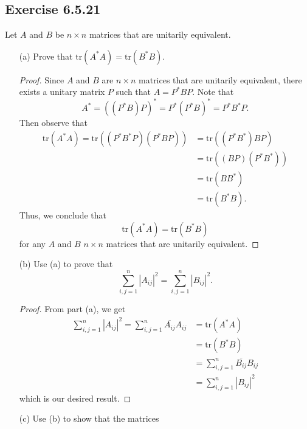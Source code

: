 \subsection*{Exercise 6.5.21} Let \( A  \) and \( B  \) be \( n \times n  \) matrices that are unitarily equivalent.
\begin{enumerate}
    \item[(a)] Prove that \( \text{tr}(A^{*}A) = \text{tr}(B^{*}B) \).
        \begin{proof}
        Since \( A  \) and \( B  \) are \( n \times n  \) matrices that are unitarily equivalent, there exists a unitary matrix \( P  \) such that \( A = P^{*} B P  \). Note that
        \[  A^{*} = ((P^{*}B)P)^{*} = P^{*} (P^{*} B)^{*} = P^{*} B^{*} P. \]
        Then observe that
        \begin{align*}
            \text{tr}(A^{*}A) = \text{tr}((P^{*}B^{*}P)(P^{*}BP)) &= \text{tr}( (P^{*}B^{*}) BP) \\
                                                                  &= \text{tr}((BP)(P^{*}B^{*})) \\ 
                                                                  &= \text{tr}(B B^{*}) \\
                                                                  &= \text{tr}(B^{*}B).
        \end{align*}
        Thus, we conclude that 
        \[  \text{tr}(A^{*}A) = \text{tr}(B^{*}B) \]
        for any \( A  \) and \( B  \) \( n \times n  \) matrices that are unitarily equivalent.
        \end{proof}
    \item[(b)] Use (a) to prove that 
        \[  \sum_{ i,j = 1  }^{ n   } |{A}_{ij}|^{2} = \sum_{ i,j = 1  }^{ n  } | {B}_{ij} |^{2}. \]
        \begin{proof}
        From part (a), we get
        \begin{align*}  \sum_{ i,j = 1  }^{ n } | {A}_{ij} |^{2} = \sum_{ i,j = 1  }^{ n  } \overline{{A}_{ij}} {A}_{ij}   &= \text{tr}(A^{*}A) \\ 
            &= \text{tr}(B^{*}B) \\ 
            &= \sum_{ i,j = 1  }^{ n } \overline{{B}_{ij}} {B}_{ij} \\ 
            &= \sum_{ i,j = 1  }^{ n  } | {B}_{ij} |^{2}
        \end{align*}
        which is our desired result.
        \end{proof}
    \item[(c)] Use (b) to show that the matrices

\end{enumerate}
